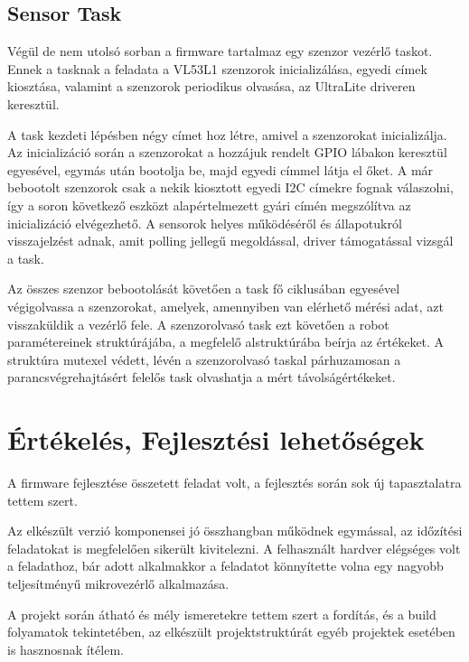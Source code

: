 \subsection{Sensor Task}

Végül de nem utolsó sorban a firmware tartalmaz egy szenzor vezérlő taskot. Ennek
a tasknak a feladata a VL53L1 szenzorok inicializálása, egyedi címek kiosztása,
valamint a szenzorok periodikus olvasása, az UltraLite driveren keresztül.

\medskip

A task kezdeti lépésben négy címet hoz létre, amivel a szenzorokat
inicializálja. Az inicializáció során a szenzorokat a hozzájuk rendelt GPIO
lábakon keresztül egyesével, egymás után bootolja be, majd egyedi címmel látja el
őket. A már bebootolt szenzorok csak a nekik kiosztott egyedi I2C címekre fognak
válaszolni, így a soron következő eszközt alapértelmezett gyári címén megszólítva
az inicializáció elvégezhető. A sensorok helyes működéséről és állapotukról
visszajelzést adnak, amit polling jellegű megoldással, driver támogatással
vizsgál a task.

Az összes szenzor bebootolását követően a task fő ciklusában egyesével
végigolvassa a szenzorokat, amelyek, amennyiben van elérhető mérési adat, azt
visszaküldik a vezérlő fele. A szenzorolvasó task ezt követően a robot
paramétereinek struktúrájába, a megfelelő alstruktúrába beírja az értékeket. A
struktúra mutexel védett, lévén a szenzorolvasó taskal párhuzamosan a
parancsvégrehajtásért felelős task olvashatja a mért távolságértékeket. 

\section{Értékelés, Fejlesztési lehetőségek}

A firmware fejlesztése összetett feladat volt, a fejlesztés során sok új
tapasztalatra tettem szert.

\medskip

Az elkészült verzió komponensei jó összhangban működnek egymással, az időzítési
feladatokat is megfelelően sikerült kivitelezni. A felhasznált hardver elégséges
volt a feladathoz, bár adott alkalmakkor a feladatot könnyítette volna egy
nagyobb teljesítményű mikrovezérlő alkalmazása.

A projekt során átható és mély ismeretekre tettem szert a fordítás, és a build
folyamatok tekintetében, az elkészült projektstruktúrát egyéb projektek
esetében is hasznosnak ítélem.  

